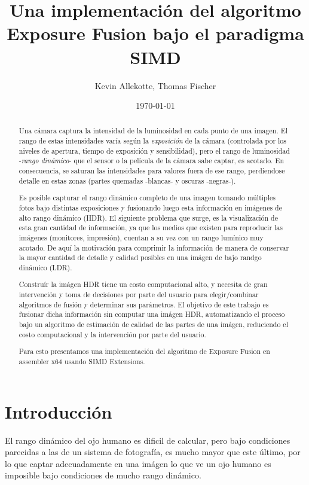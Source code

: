\documentclass[a4paper,10pt]{article}
\title{Una implementación del algoritmo Exposure Fusion bajo el paradigma SIMD}
\author{Kevin Allekotte, Thomas Fischer}
\date{\today}
\begin{document}
    \maketitle

    \begin{abstract}
        Una cámara captura la intensidad de la luminosidad en cada punto de una imagen. El rango de estas intensidades varía según la \emph{exposición} de la cámara (controlada por los niveles de apertura, tiempo de exposición y sensibilidad), pero el rango de luminosidad -\emph{rango dinámico}- que el sensor o la película de la cámara sabe captar, es acotado. En consecuencia, se saturan las intensidades para valores fuera de ese rango, perdiendose detalle en estas zonas (partes quemadas -blancas- y oscuras -negras-).

        Es posible capturar el rango dinámico completo de una imagen tomando múltiples fotos bajo distintas exposiciones y fusionando luego esta información en imágenes de alto rango dinámico (HDR). El siguiente problema que surge, es la visualización de esta gran cantidad de información, ya que los medios que existen para reproducir las imágenes (monitores, impresión), cuentan a su vez con un rango lumínico muy acotado. De aquí la motivación para comprimir la información de manera de conservar la mayor cantidad de detalle y calidad posibles en una imágen de bajo randgo dinámico (LDR).

        Construír la imágen HDR tiene un costo computacional alto, y necesita de gran intervención y toma de decisiones por parte del usuario para elegir/combinar algoritmos de fusión y determinar sus parámetros. El objetivo de este trabajo es fusionar dicha información sin computar una imágen HDR, automatizando el proceso bajo un algoritmo de estimación de calidad de las partes de una imágen, reduciendo el costo computacional y la intervención por parte del usuario.

        Para esto presentamos una implementación del algoritmo de Exposure Fusion \cite{DBLP:conf/pg/MertensKR07} en assembler x64 usando SIMD Extensions.
    \end{abstract}

    \section{Introducción}

        El rango dinámico del ojo humano es dificil de calcular, pero bajo condiciones parecidas a las de un sistema de fotografía, es mucho mayor que este último, por lo que captar adecuadamente en una imágen lo que ve un ojo humano es imposible bajo condiciones de mucho rango dinámico.
\end{document}
